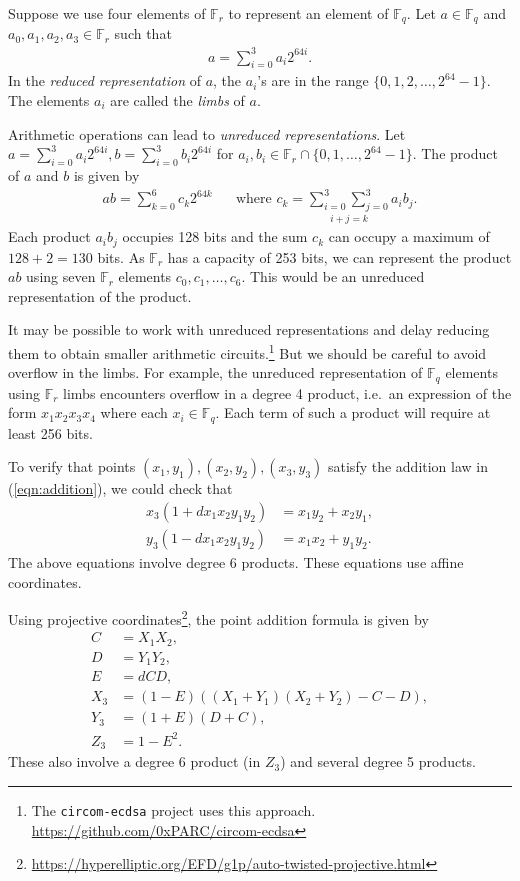 \documentclass[a4paper, 12pt]{article}
\begin{document}
Suppose we use four elements of $\mathbb{F}_r$ to represent an element of $\mathbb{F}_q$. Let $a \in \mathbb{F}_q$ and $a_0, a_1, a_2, a_3 \in \mathbb{F}_r$ such that
\begin{align*}
  a = \sum^{3}_{i=0} a_i 2^{64i}.
\end{align*}
In the \textit{reduced representation} of $a$, the $a_i$'s are in the range  $\{0,1,2,\ldots,2^{64}-1\}$. The elements $a_i$ are called the \textit{limbs} of $a$.

Arithmetic operations can lead to \textit{unreduced representations}. Let $a=\sum_{i=0}^{3} a_i 2^{64i}, b=\sum_{i=0}^{3} b_i 2^{64i}$ for $a_i, b_i \in \mathbb{F}_{r} \cap \{0,1,\ldots,2^{64}-1\}$. The product of $a$ and $b$ is given by
\begin{align*}
  ab = \sum^{6}_{k=0} c_k 2^{64k}  \ \ \ \ \ \ \text{ where } c_k = \underset{i+j=k}{\sum_{i=0}^3 \sum_{j=0}^3} a_i b_j.
\end{align*}
Each product $a_ib_j$ occupies 128 bits and the sum $c_k$ can occupy a maximum of $128 + 2 = 130$ bits. As $\mathbb{F}_r$ has a capacity of 253 bits, we can represent the product $ab$ using seven $\mathbb{F}_r$ elements $c_0,c_1,\ldots,c_6$. This would be an unreduced representation of the product.

It may be possible to work with unreduced representations and delay reducing them to obtain smaller arithmetic circuits.\footnote{The \texttt{circom-ecdsa} project uses this approach. \url{https://github.com/0xPARC/circom-ecdsa}} But we should be careful to avoid overflow in the limbs. For example, the unreduced representation of $\mathbb{F}_q$ elements using $\mathbb{F}_r$ limbs encounters overflow in a degree 4 product, i.e.~an expression of the form $x_1 x_2 x_3 x_4$ where each $x_i \in \mathbb{F}_q$. Each term of such a product will require at least 256 bits.

To verify that points $(x_1, y_1), (x_2, y_2), (x_3, y_3)$ satisfy the addition law in (\ref{eqn:addition}), we could check that
\begin{align*}
  x_3(1+dx_1x_2y_1y_2) &= x_1y_2 + x_2y_1,\\
  y_3(1-dx_1x_2y_1y_2) &= x_1x_2 + y_1y_2.
\end{align*}
The above equations involve degree 6 products. These equations use affine coordinates.

Using projective coordinates\footnote{\url{https://hyperelliptic.org/EFD/g1p/auto-twisted-projective.html}}, the point addition formula is given by
\begin{align*}
  C   & = X_1X_2,\\
  D   & = Y_1Y_2,\\
  E   & = dCD,\\
  X_3  & = (1-E)((X_1+Y_1)(X_2+Y_2)-C-D),\\
  Y_3  & = (1+E)(D+C),\\
  Z_3  & = 1-E^2.
\end{align*}
These also involve a degree 6 product (in $Z_3$) and several degree 5 products.
\end{document}
